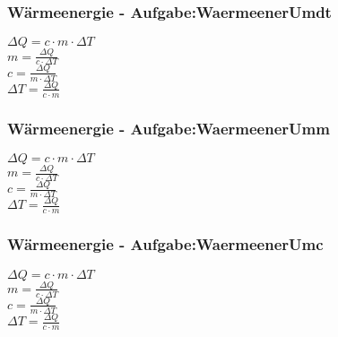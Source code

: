 \subsubsection{Wärmeenergie - Aufgabe:WaermeenerUmdt} 
\begin{minipage}{0.45\textwidth} 
$ \Delta Q = c\cdot m\cdot \Delta T $\\ 
$ m = \frac{ \Delta Q}{c\cdot \Delta T} $\\ 
$ c = \frac{ \Delta Q}{m\cdot \Delta T} $\\ 
$ \Delta T = \frac{\Delta Q}{c\cdot m} $\\ 
\end{minipage} 
\begin{minipage}{0.45\textwidth} 
 
\end{minipage} 
\subsubsection{Wärmeenergie - Aufgabe:WaermeenerUmm} 
\begin{minipage}{0.45\textwidth} 
$ \Delta Q = c\cdot m\cdot \Delta T $\\ 
$ m = \frac{ \Delta Q}{c\cdot \Delta T} $\\ 
$ c = \frac{ \Delta Q}{m\cdot \Delta T} $\\ 
$ \Delta T = \frac{\Delta Q}{c\cdot m} $\\ 
\end{minipage} 
\begin{minipage}{0.45\textwidth} 
 
\end{minipage} 
\subsubsection{Wärmeenergie - Aufgabe:WaermeenerUmc} 
\begin{minipage}{0.45\textwidth} 
$ \Delta Q = c\cdot m\cdot \Delta T $\\ 
$ m = \frac{ \Delta Q}{c\cdot \Delta T} $\\ 
$ c = \frac{ \Delta Q}{m\cdot \Delta T} $\\ 
$ \Delta T = \frac{\Delta Q}{c\cdot m} $\\ 
\end{minipage} 
\begin{minipage}{0.45\textwidth} 
 
\end{minipage} 
